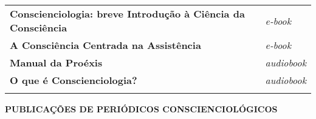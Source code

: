 \begin{longtable}[]{@{}
  >{\raggedright\arraybackslash}p{}
  >{\raggedright\arraybackslash}p{}@{}}
\begin{minipage}[b]{\linewidth}
\textbf{Conscienciologia: breve Introdução à Ciência da Consciência}
\end{minipage} & \begin{minipage}[b]{\linewidth}\raggedright
\emph{e-book}
\end{minipage} \\
\begin{minipage}[b]{\linewidth}\raggedright
\textbf{A Consciência Centrada na Assistência}
\end{minipage} & \begin{minipage}[b]{\linewidth}\raggedright
\emph{e-book}
\end{minipage} \\
\begin{minipage}[b]{\linewidth}\raggedright
\textbf{Manual da Proéxis}
\end{minipage} & \begin{minipage}[b]{\linewidth}\raggedright
\emph{audiobook}
\end{minipage} \\
\begin{minipage}[b]{\linewidth}\raggedright
\textbf{O que é Conscienciologia?}
\end{minipage} & \begin{minipage}[b]{\linewidth}\raggedright
\emph{audiobook}
\end{minipage} \\
\midrule\noalign{}
\endhead
\bottomrule\noalign{}
\endlastfoot
\end{longtable}

\textbf{PUBLICAÇÕES DE PERIÓDICOS CONSCIENCIOLÓGICOS}

